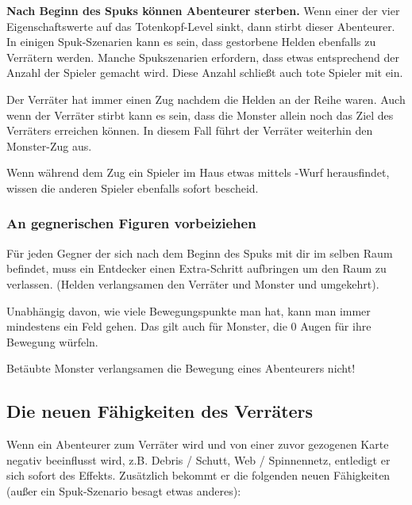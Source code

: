 \textbf{Nach Beginn des Spuks können Abenteurer sterben.} Wenn einer der vier Eigenschaftswerte auf das Totenkopf-Level sinkt, dann stirbt dieser Abenteurer. In einigen Spuk-Szenarien kann es sein, dass gestorbene Helden ebenfalls zu Verrätern werden. Manche Spukszenarien erfordern, dass etwas entsprechend der Anzahl der Spieler gemacht wird. Diese Anzahl schließt auch tote Spieler mit ein.

Der Verräter hat immer einen Zug nachdem die Helden an der Reihe waren. Auch wenn der Verräter stirbt kann es sein, dass die Monster allein noch das Ziel des Verräters erreichen können. In diesem Fall führt der Verräter weiterhin den Monster-Zug aus.

Wenn während dem Zug ein Spieler im Haus etwas mittels \know-Wurf herausfindet, wissen die anderen Spieler ebenfalls sofort bescheid.

\subsubsection{An gegnerischen Figuren vorbeiziehen}

Für jeden Gegner der sich nach dem Beginn des Spuks mit dir im selben Raum befindet, muss ein Entdecker einen Extra-Schritt aufbringen um den Raum zu verlassen. (Helden verlangsamen den Verräter und Monster und umgekehrt).

Unabhängig davon, wie viele Bewegungspunkte man hat, kann man immer mindestens ein Feld gehen. Das gilt auch für Monster, die 0 Augen für ihre Bewegung würfeln.

Betäubte Monster verlangsamen die Bewegung eines Abenteurers nicht!

\subsection{Die neuen Fähigkeiten des Verräters}
\label{kap:rule:newtraitorpowers}

Wenn ein Abenteurer zum Verräter wird und von einer zuvor gezogenen Karte negativ beeinflusst wird, z.B. Debris / Schutt, Web / Spinnennetz, entledigt er sich sofort des Effekts. Zusätzlich bekommt er die folgenden neuen Fähigkeiten (außer ein Spuk-Szenario besagt etwas anderes):

